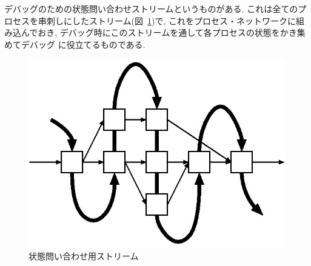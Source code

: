 \documentclass[a4,titlepage]{jsreport}
\begin{document}
%

デバッグのための状態問い合わせストリームというものがある.  
これは全てのプロセスを串刺しにしたストリーム(図~\ref{jotai})で, 
これをプロセス・ネットワークに組み込んでおき, 
デバッグ時にこのストリームを通して各プロセスの状態をかき集めてデバッグ
に役立てるものである.  

\begin{figure}
\begin{center}
\includegraphics{fig/jotai.eps}
\caption{状態問い合わせ用ストリーム}
\label{jotai}
\end{center}
\end{figure}
\end{document}
